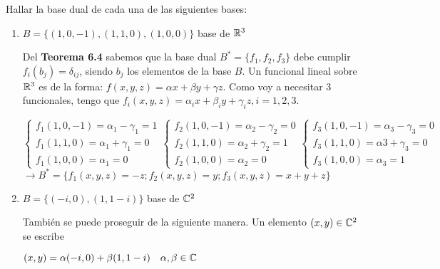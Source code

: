 \item Hallar la base dual de cada una de las siguientes bases:
    \begin{enumerate}
        \item $B=\{(1,0,-1),(1,1,0),(1,0,0)\}$ base de $\mathbb{R}^3$
            \begin{mdframed}[style=s]
                Del \textbf{Teorema 6.4} sabemos que la base dual $B^*=\{f_1,f_2,f_3\}$ debe cumplir $f_i(b_j)=\delta_{ij}$, siendo $b_j$ los elementos de la base $B$. Un funcional lineal sobre $\mathbb{R}^3$ es de la forma: $f(x,y,z)=\alpha x+\beta y+\gamma z$. Como voy a necesitar 3 funcionales, tengo que $f_i(x,y,z)=\alpha_ix+\beta_iy+\gamma_iz, i=1,2,3.$
                \begin{center}
                    $
                    \begin{cases}
                        f_1(1,0,-1)=\alpha_1-\gamma_1=1\\
                        f_1(1,1,0)=\alpha_1+\gamma_1=0\\
                        f_1(1,0,0)=\alpha_1=0
                    \end{cases}
                    \begin{cases}
                        f_2(1,0,-1)=\alpha_2-\gamma_2=0\\
                        f_2(1,1,0)=\alpha_2+\gamma_2=1\\
                        f_2(1,0,0)=\alpha_2=0
                    \end{cases}
                    \begin{cases}
                        f_3(1,0,-1)=\alpha_3-\gamma_3=0\\
                        f_3(1,1,0)=\alpha3+\gamma_3=0\\
                        f_3(1,0,0)=\alpha_3=1
                    \end{cases}$\\
                    $\to B^*=\{f_1(x,y,z)=-z;f_2(x,y,z)=y;f_3(x,y,z)=x+y+z\}$
                \end{center}
            \end{mdframed}
        \item $B=\{(-i,0),(1,1-i)\}$ base de $\mathbb{C}^2$
            \begin{mdframed}[style=s]
                También se puede proseguir de la siguiente manera. Un elemento $(x,y)\in \mathbb{C}^2$ se escribe
                \begin{tightcenter}
                    $(x,y)=\alpha(-i,0)+\beta(1,1-i)\quad\alpha,\beta\in\mathbb{C}$

\end{tightcenter}
\end{mdframed}
\end{enumerate}
